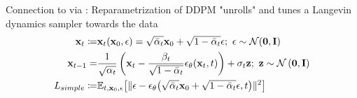 \documentclass[./presentation.tex]{subfiles}
\begin{document}
\begin{frame}[label=diffusion]
{{  Connection to \cite{niuPermutationInvariantGraph2020b} via \cite{songGenerativeModelingEstimating2019b}: Reparametrization of DDPM \citep{hoDenoisingDiffusionProbabilistic2020f} "unrolls" and tunes a Langevin dynamics sampler towards the data
  \begin{align}
    \rvx_{t}\coloneqq&\func{\rvx_t}{\rvx_0,\mathbf{\epsilon}}=\sqrt{\bar{\alpha}_t}\rvx_0+\sqrt{1-\bar{\alpha}_t}\mathbf{\epsilon};\ \mathbf{\epsilon}\sim\func{\mathcal{N}}{\mathbf{0},\rvI}\nonumber\\
    \rvx_{t-1}=&\frac{1}{\sqrt{\alpha_t}}\left(\rvx_t-\frac{\beta_t}{\sqrt{1-\bar{\alpha}_t}}\func{\mathbf{\epsilon}_\theta}{\rvx_t,t}\right)+\sigma_t\rvz;\ \rvz\sim\mathcal{N}\left(\mathbf{0},\rvI \right)\nonumber\\
    L_{simple}\coloneqq&\mathbb{E}_{t,\rvx_0,\mathbf{\epsilon}}\bigl[ \Vert \mathbf{\epsilon}-\func{\mathbf{\epsilon}_\theta}{\sqrt{\bar{\alpha}_t}\rvx_0+\sqrt{1-\bar{\alpha}_t}\mathbf{\epsilon},t} \Vert^2 \bigr]\nonumber
  \end{align}
}
}
\end{frame}
\end{document}
